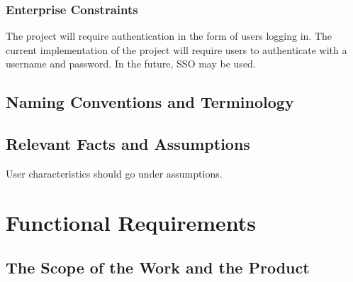 \documentclass[12pt]{article}
\begin{document}
\subsubsection{Enterprise Constraints}
The project will require authentication in the form of users logging in. The current implementation
of the project will require users to authenticate with a username and password. In the future, SSO
may be used.

\subsection{Naming Conventions and Terminology}

\subsection{Relevant Facts and Assumptions}

User characteristics should go under assumptions.

\section{Functional Requirements}

\subsection{The Scope of the Work and the Product}
\end{document}
